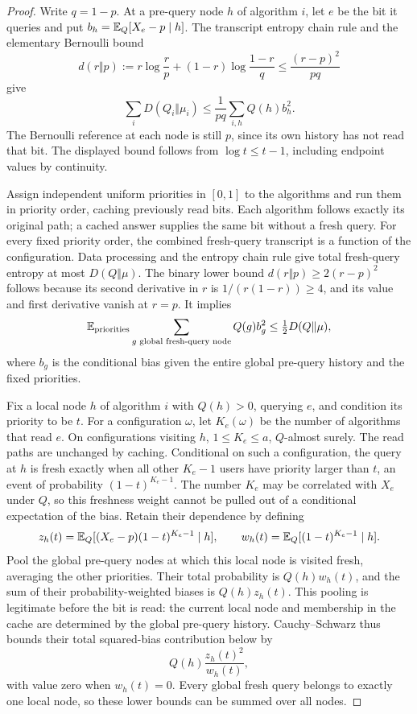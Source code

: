 \begin{proof}
Write $q=1-p$. At a pre-query node $h$ of algorithm $i$, let $e$
be the bit it queries and put
$b_h=\mathbb E_Q[X_e-p\mid h]$. The transcript entropy chain rule and
the elementary Bernoulli bound
\[
 d(r\Vert p):=r\log\frac rp+(1-r)\log\frac{1-r}q
 \le\frac{(r-p)^2}{pq}
\]
give
\begin{equation}\label{eq:local-transcript-entropy}
 \sum_iD(Q_i\Vert\mu_i)
 \le\frac1{pq}\sum_{i,h}Q(h)b_h^2.
\end{equation}
The Bernoulli reference at each node is still $p$, since its own
history has not read that bit. The displayed bound follows from
$\log t\le t-1$, including endpoint values by continuity.

Assign independent uniform priorities in $[0,1]$ to the algorithms
and run them in priority order, caching previously read bits. Each
algorithm follows exactly its original path; a cached answer supplies
the same bit without a fresh query. For every fixed priority order,
the combined fresh-query transcript is a function of the configuration.
Data processing and the entropy chain rule give total fresh-query
entropy at most $D(Q\Vert\mu)$. The binary lower bound
$d(r\Vert p)\ge2(r-p)^2$ follows because its second derivative in
$r$ is $1/(r(1-r))\ge4$, and its value and first derivative vanish
at $r=p$. It implies
\begin{equation}\label{eq:global-transcript-budget}
 \mathbb E_{\rm priorities}
 \sum_{g\text{ global fresh-query node}}Q(g)b_g^2
 \le\tfrac12D(Q\Vert\mu),
\end{equation}
where $b_g$ is the conditional bias given the entire global pre-query
history and the fixed priorities.

Fix a local node $h$ of algorithm $i$ with $Q(h)>0$, querying $e$,
and condition its priority to be $t$. For a configuration $\omega$,
let $K_e(\omega)$ be the number of algorithms that read $e$.
On configurations visiting $h$, $1\le K_e\le a$, $Q$-almost surely.
The read paths are unchanged by caching. Conditional on such a
configuration, the query at $h$ is fresh exactly when all other
$K_e-1$ users have priority larger than $t$, an event of probability
$(1-t)^{K_e-1}$.
The number $K_e$ may be correlated with $X_e$ under $Q$, so this
freshness weight cannot be pulled out of a conditional expectation of
the bias. Retain their dependence by defining
\[
 z_h(t)=\mathbb E_Q[(X_e-p)(1-t)^{K_e-1}\mid h],\qquad
 w_h(t)=\mathbb E_Q[(1-t)^{K_e-1}\mid h].
\]
Pool the global pre-query nodes at which this local node is visited
fresh, averaging the other priorities. Their total probability is
$Q(h)w_h(t)$, and the sum of their probability-weighted biases is
$Q(h)z_h(t)$. This pooling is legitimate before the bit is read:
the current local node and membership in the cache are determined by
the global pre-query history. Cauchy--Schwarz thus bounds their
total squared-bias contribution below by
\begin{equation}\label{eq:entropy-pooled-bias}
 Q(h)\frac{z_h(t)^2}{w_h(t)},
\end{equation}
with value zero when $w_h(t)=0$.
Every global fresh query belongs to exactly one local node, so these
lower bounds can be summed over all nodes.


\end{proof}
